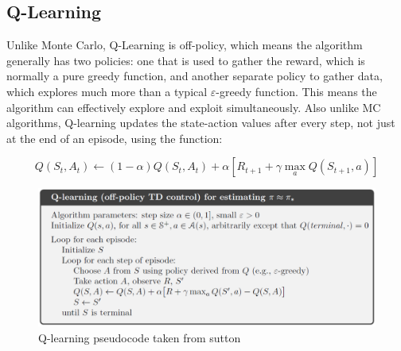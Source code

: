 \subsection{Q-Learning}

Unlike Monte Carlo, Q-Learning is off-policy, which means the algorithm generally has two policies: one that is used to gather the reward, which is normally a pure greedy function, and another separate policy to gather data, which  explores much more than a typical $\varepsilon$-greedy function. This means the algorithm can effectively explore and exploit simultaneously. Also unlike MC algorithms, Q-learning updates the state-action values after every step, not just at the end of an episode, using the function:

\begin{equation}
Q\left(S_t,A_t\right) \leftarrow \left(1-\alpha\right)Q\left(S_t,A_t\right) + \alpha\left[R_{t+1}+\gamma \max_aQ\left(S_{t+1},a\right)\right]
\end{equation}

\begin{figure}[h]
\includegraphics[width=\textwidth]{images/Q-learning}
\caption[Q-learning pseudocode]{Q-learning pseudocode taken from sutton}
\end{figure}

